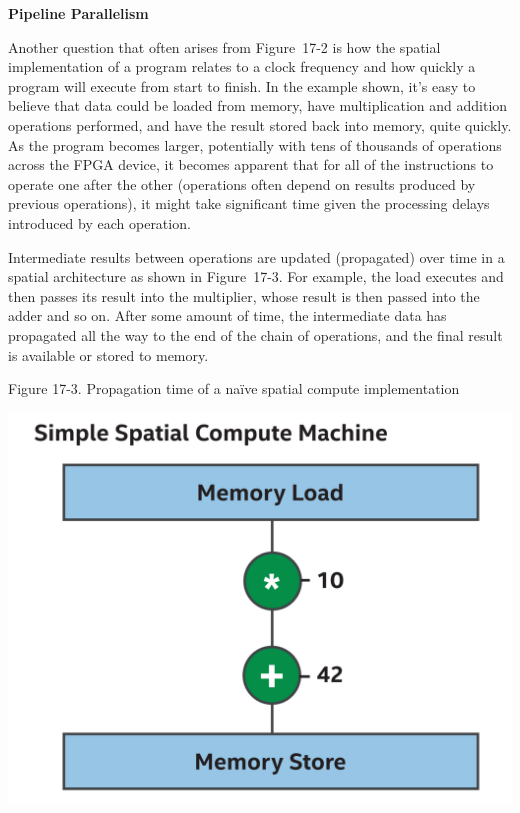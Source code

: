 \hspace*{\fill} \par %
\textbf{Pipeline Parallelism}

Another question that often arises from Figure 17-2 is how the spatial implementation of a program relates to a clock frequency and how quickly a program will execute from start to finish. In the example shown, it’s easy to believe that data could be loaded from memory, have multiplication and addition operations performed, and have the result stored back into memory, quite quickly. As the program becomes larger, potentially with tens of thousands of operations across the FPGA device, it becomes apparent that for all of the instructions to operate one after the other (operations often depend on results produced by previous operations), it might take significant time given the processing delays introduced by each operation.\par

Intermediate results between operations are updated (propagated) over time in a spatial architecture as shown in Figure 17-3. For example, the load executes and then passes its result into the multiplier, whose result is then passed into the adder and so on. After some amount of time, the intermediate data has propagated all the way to the end of the chain of operations, and the final result is available or stored to memory.\par

\hspace*{\fill} \par %
Figure 17-3. Propagation time of a naïve spatial compute 
implementation
\begin{center}
	\includegraphics[width=1.0\textwidth]{content/chapter-17/images/3}
\end{center}

